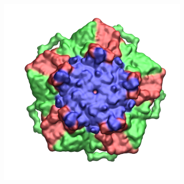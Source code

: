 \documentclass[8pt]{beamer}
\begin{document}
\begin{frame}[t]
{\begin{figure}[ht]
\begin{subfigure}[t]{.46\textwidth}
  \includegraphics[width=1\textwidth]{Figure/TrV_Pentamer_Ch4.png}
  \end{subfigure}
\hspace*{\fill}
\end{figure}
}


\end{frame}
\end{document}
